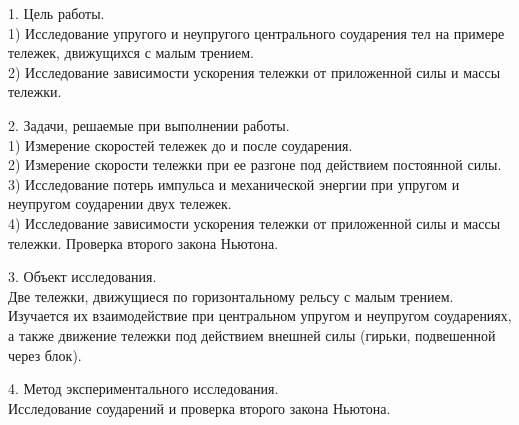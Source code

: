 \documentclass[12pt]{article}
\begin{document}
\noindent\makebox[\linewidth]{\rule{\textwidth}{1pt}}
\noindent\makebox[\linewidth]{\rule{\textwidth}{1pt}}

\begin{flushleft}
    1. Цель работы.\\
    \hspace{0.63cm}1) Исследование упругого и неупругого центрального соударения тел на примере тележек, движущихся с малым трением. \\
    \hspace{0.63cm}2) Исследование зависимости ускорения тележки от приложенной силы и массы тележки.
\end{flushleft}

\begin{flushleft}
    2. Задачи, решаемые при выполнении работы.\\
    \hspace{0.63cm}1) Измерение скоростей тележек до и после соударения. \\
    \hspace{0.63cm}2) Измерение скорости тележки при ее разгоне под действием постоянной силы. \\
    \hspace{0.63cm}3) Исследование потерь импульса и механической энергии при упругом и неупругом соударении двух тележек. \\
    \hspace{0.63cm}4) Исследование зависимости ускорения тележки от приложенной силы и массы тележки. Проверка второго закона Ньютона. \\
\end{flushleft}

\begin{flushleft}
    3. Объект исследования. \\
    Две тележки, движущиеся по горизонтальному рельсу с малым трением. Изучается
    их взаимодействие при центральном упругом и неупругом соударениях, а также
    движение тележки под действием внешней силы (гирьки, подвешенной через блок). \\
\end{flushleft}

\begin{flushleft}
    4. Метод экспериментального исследования. \\
    Исследование соударений и проверка второго закона Ньютона. \\
\end{flushleft}
\end{document}
